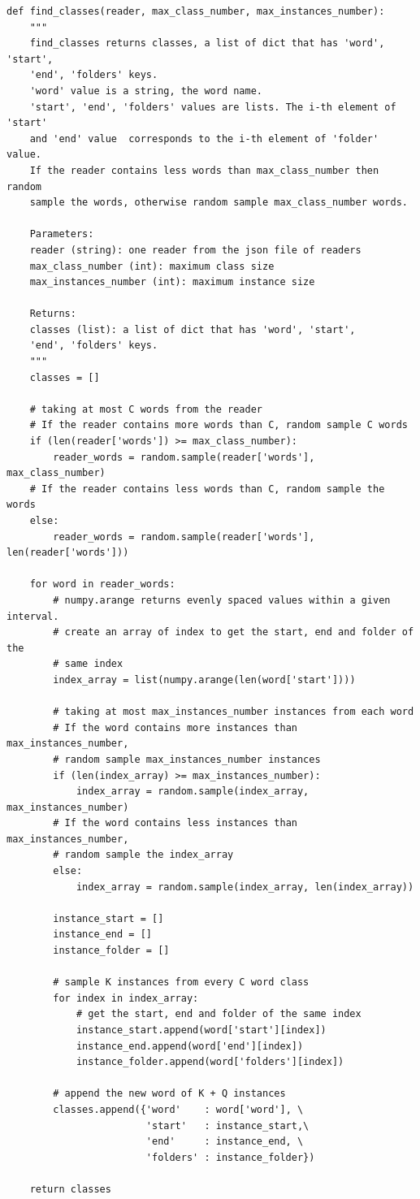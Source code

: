\documentclass[12pt,a4paper,titlepage]{article}
\begin{document}
\begin{lstlisting}[language=iPython,firstnumber=10, caption=Funzione \texttt{find\_classes}, label=find_classes,captionpos=b]
def find_classes(reader, max_class_number, max_instances_number):
    """
    find_classes returns classes, a list of dict that has 'word', 'start',
    'end', 'folders' keys.
    'word' value is a string, the word name.
    'start', 'end', 'folders' values are lists. The i-th element of 'start' 
    and 'end' value  corresponds to the i-th element of 'folder' value.
    If the reader contains less words than max_class_number then random 
    sample the words, otherwise random sample max_class_number words.

    Parameters:
    reader (string): one reader from the json file of readers 
    max_class_number (int): maximum class size
    max_instances_number (int): maximum instance size

    Returns:
    classes (list): a list of dict that has 'word', 'start',
    'end', 'folders' keys.
    """
    classes = []

    # taking at most C words from the reader
    # If the reader contains more words than C, random sample C words
    if (len(reader['words']) >= max_class_number):
        reader_words = random.sample(reader['words'], max_class_number)
    # If the reader contains less words than C, random sample the words
    else:
        reader_words = random.sample(reader['words'], len(reader['words']))  

    for word in reader_words:
        # numpy.arange returns evenly spaced values within a given interval.
        # create an array of index to get the start, end and folder of the
        # same index
        index_array = list(numpy.arange(len(word['start'])))
        
        # taking at most max_instances_number instances from each word
        # If the word contains more instances than max_instances_number,
        # random sample max_instances_number instances
        if (len(index_array) >= max_instances_number):
            index_array = random.sample(index_array, max_instances_number)
        # If the word contains less instances than max_instances_number,
        # random sample the index_array
        else:
            index_array = random.sample(index_array, len(index_array))  

        instance_start = []
        instance_end = []
        instance_folder = []
        
        # sample K instances from every C word class
        for index in index_array:
            # get the start, end and folder of the same index
            instance_start.append(word['start'][index])
            instance_end.append(word['end'][index])
            instance_folder.append(word['folders'][index])

        # append the new word of K + Q instances
        classes.append({'word'    : word['word'], \
                        'start'   : instance_start,\
                        'end'     : instance_end, \
                        'folders' : instance_folder})

    return classes
\end{lstlisting}
\end{document}
